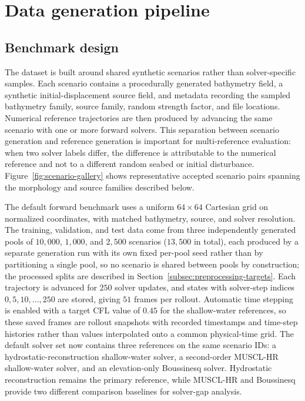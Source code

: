 \section{Data generation pipeline}
\label{sec:data-generation}

\subsection{Benchmark design}
\label{subsec:benchmark-design}

The dataset is built around shared synthetic scenarios rather than solver-specific samples. Each scenario contains a procedurally generated bathymetry field, a synthetic initial-displacement source field, and metadata recording the sampled bathymetry family, source family, random strength factor, and file locations. Numerical reference trajectories are then produced by advancing the same scenario with one or more forward solvers. This separation between scenario generation and reference generation is important for multi-reference evaluation: when two solver labels differ, the difference is attributable to the numerical reference and not to a different random seabed or initial disturbance. Figure~\ref{fig:scenario-gallery} shows representative accepted scenario pairs spanning the morphology and source families described below.

The default forward benchmark uses a uniform $64 \times 64$ Cartesian grid on normalized coordinates, with matched bathymetry, source, and solver resolution. The training, validation, and test data come from three independently generated pools of $10{,}000$, $1{,}000$, and $2{,}500$ scenarios ($13{,}500$ in total), each produced by a separate generation run with its own fixed per-pool seed rather than by partitioning a single pool, so no scenario is shared between pools by construction; the processed splits are described in Section~\ref{subsec:preprocessing-targets}. Each trajectory is advanced for $250$ solver updates, and states with solver-step indices $0, 5, 10, \ldots, 250$ are stored, giving $51$ frames per rollout. Automatic time stepping is enabled with a target CFL value of $0.45$ for the shallow-water references, so these saved frames are rollout snapshots with recorded timestamps and time-step histories rather than values interpolated onto a common physical-time grid. The default solver set now contains three references on the same scenario IDs: a hydrostatic-reconstruction shallow-water solver, a second-order MUSCL-HR shallow-water solver, and an elevation-only Boussinesq solver. Hydrostatic reconstruction remains the primary reference, while MUSCL-HR and Boussinesq provide two different comparison baselines for solver-gap analysis.

